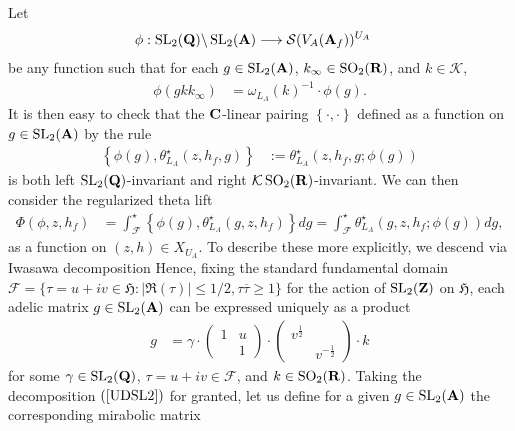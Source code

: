 \documentclass{amsart}
\theoremstyle{definition}
\begin{document}
Let \begin{align*} \phi: \operatorname{SL}_2({\bf{Q}}) \backslash \operatorname{SL}_2({\bf{A}}) 
&\longrightarrow \mathcal{S}(V_A({\bf{A}}_f))^{U_A} \end{align*}
be any function such that for each $g \in \operatorname{SL}_2({\bf{A}})$, $k_{\infty} \in \operatorname{SO}_2({\bf{R}})$, and $k \in \mathcal{K}$,
\begin{align*} \phi(g k k_{\infty}) &= \omega_{L_A}(k)^{-1} \cdot \phi(g). \end{align*}
It is then easy to check that the ${\bf{C}}$-linear pairing $\left\{ \cdot, \cdot \right\} $ defined as a function on $g \in \operatorname{SL}_2({\bf{A}})$ by the rule
\begin{align*} \left\{ \phi(g), \theta_{L_A}^{\star}(z, h_f, g) \right\} &:= \theta_{ L_A }^{\star}(z, h_f, g; \phi(g)) \end{align*}
is both left $\operatorname{SL}_2({\bf{Q}})$-invariant and right $\mathcal{K} \operatorname{SO}_2({\bf{R}})$-invariant. 
We can then consider the regularized theta lift
\begin{align*}\Phi(\phi, z, h_f)  &= \int_{ \mathcal{F} }^{\star} \left\{ \phi(g), \theta_{L_A}^{\star}(g, z, h_f) \right \} dg
= \int_{ \mathcal{F}}^{\star} \theta_{L_A}^{\star}(g, z, h_f;  \phi(g)) dg, \end{align*}
as a function on $(z, h) \in X_{U_A}$. To describe these more explicitly, we descend via Iwasawa decomposition 
Hence, fixing the standard fundamental domain 
$\mathcal{F} = \lbrace \tau = u + iv \in \mathfrak{H}: \vert \Re(\tau) \vert \leq 1/2, \tau \overline{\tau} \geq 1 \rbrace$ 
for the action of $\operatorname{SL}_2({\bf{Z}})$ on $\mathfrak{H}$, each adelic matrix 
$g \in \operatorname{SL}_2({\bf{A}})$ can be expressed uniquely as a product 
\begin{align}\label{UDSL2} g &= \gamma \cdot \left( \begin{array}{cc} 1 & u \\~& 1 \end{array} \right) 
\cdot \left( \begin{array}{cc} v^{\frac{1}{2}} & ~~\\~& v^{- \frac{1}{2}}\end{array} \right) \cdot k \end{align}
for some $\gamma \in \operatorname{SL}_2({\bf{Q}})$, $\tau = u+ i v \in \mathcal{F}$, and $k \in \operatorname{SO}_2({\bf{R}})$. 
Taking the decomposition $(\ref{UDSL2})$ for granted, 
let us define for a given $g \in \operatorname{SL}_2({\bf{A}})$ the corresponding mirabolic matrix 
\end{document}
